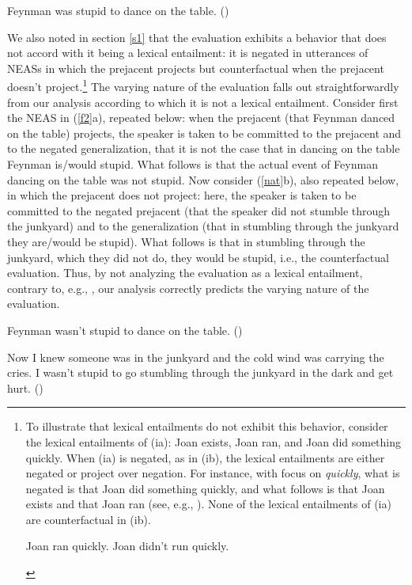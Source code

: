 \documentclass[11pt,fleqn]{article}
\newcommand{\6}{\mbox{$[\hspace*{-.6mm}[$}}
\newcommand{\9}{\mbox{$]\hspace*{-.6mm}]$}}
\begin{document}
\begin{exe} 
\exi{(\ref{f})} Feynman was stupid to dance on the table. \hfill (\citealt[18]{barker02})

\end{exe} 
We also noted in section \ref{s1} that the evaluation exhibits a behavior that does not accord with it being a lexical entailment: it is negated in utterances of NEASs in which the prejacent projects but counterfactual when the prejacent doesn't project.\footnote{To illustrate that lexical entailments do not exhibit this behavior, consider the lexical entailments of (ia): Joan exists, Joan ran, and Joan did something quickly. When (ia) is negated, as in (ib), the lexical entailments are either negated or project over negation. For instance, with focus on {\em quickly}, what is negated is that Joan did something quickly, and what follows is that Joan exists and that Joan ran (see, e.g., \citealt{abrusan2013,stevens-etal2017}). None of the lexical entailments of (ia) are counterfactual in (ib).

\begin{exe}
\begin{xlist}
\ex Joan ran quickly.
\ex Joan didn't run quickly.
\end{xlist}
\end{exe}} The varying nature of the evaluation falls out straightforwardly from our analysis according to which it is not a lexical entailment. Consider first the NEAS in  (\ref{f2}a), repeated below: when the prejacent (that Feynman danced on the table) projects, the speaker is taken to be committed to the prejacent and to the negated generalization, that it is not the case that in dancing on the table Feynman is/would stupid. What follows is that the actual event of Feynman dancing on the table was not stupid. Now consider (\ref{nat}b), also repeated below, in which the prejacent does not project: here, the speaker is taken to be committed to the negated prejacent (that the speaker did not stumble through the junkyard) and to the generalization (that in stumbling through the junkyard they are/would be stupid). What follows is that in stumbling through the junkyard, which they did not do, they would be stupid, i.e., the counterfactual evaluation. Thus, by not analyzing the evaluation as a lexical entailment, contrary to, e.g., \citealt{barker02}, our analysis correctly predicts the varying nature of the evaluation.

\begin{exe}
 Feynman wasn't stupid to dance on the table. \hfill (\citealt[18f.]{barker02})

 Now I knew someone was in the junkyard and the cold wind was
carrying the cries. I wasn't stupid to go stumbling through the
junkyard in the dark and get hurt. \hfill (\citealt[235]{karttunen-etal2014})

\end{exe}
\end{document}
